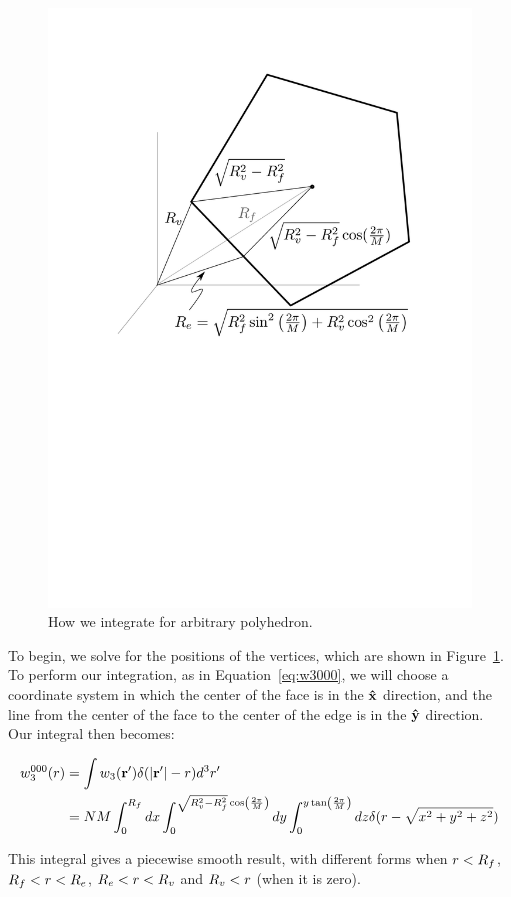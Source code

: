 \documentclass[letterpaper,twocolumn,amsmath,amssymb,pre]{revtex4-1}
\begin{document}
\begin{figure}
\includegraphics[width=\columnwidth]{figs/w3-000}
\caption{How we integrate for arbitrary polyhedron.}\label{fig:r3000}
\end{figure}

To begin, we solve for the positions of the vertices, which are shown
in Figure~\ref{fig:r3000}.  To perform our integration, as in
Equation~\ref{eq:w3000}, we will choose a coordinate system in which
the center of the face is in the $\mathbf{\hat{x}}$ direction, and the line from the
center of the face to the center of the edge is in the $\mathbf{\hat{y}}$
direction.  Our integral then becomes:
\begin{widetext}
\begin{align}
  w_3^{000}(r) &= \int w_3(\mathbf{r}') \delta(|\mathbf{r}'|-r) d^3r'
  \\
  &= NM \int_0^{R_f} dx
  \int_0^{\sqrt{R_v^2-R_f^2}\cos\left(\frac{2\pi}{M}\right)} dy
  \int_0^{y\tan\left(\frac{2\pi}{M}\right)} dz \delta(r - \sqrt{x^2 +
    y^2 + z^2})
\end{align}
\end{widetext}
This integral gives a piecewise smooth result, with different forms
when $r<R_f$, $R_f<r<R_e$, $R_e<r<R_v$ and $R_v<r$ (when it is zero).
\end{document}
